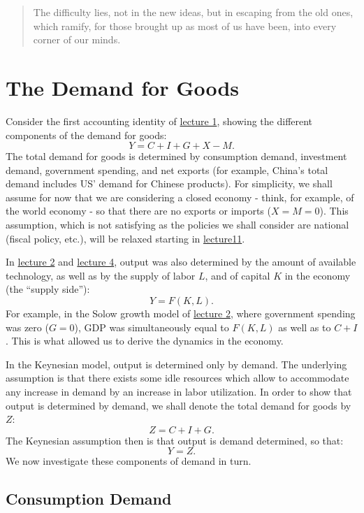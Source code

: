 \documentclass[]{book}
\theoremstyle{definition}
\theoremstyle{definition}
\theoremstyle{definition}
\theoremstyle{remark}
\begin{document}
\begin{quote}
The difficulty lies, not in the new ideas, but in escaping from the old
ones, which ramify, for those brought up as most of us have been, into
every corner of our minds.
\end{quote}

\section{The Demand for Goods}\label{the-demand-for-goods}

Consider the first accounting identity of
\protect\hyperlink{intro-cobb}{lecture 1}, showing the different
components of the demand for goods: \[Y=C+I+G+X-M.\] The total demand
for goods is determined by consumption demand, investment demand,
government spending, and net exports (for example, China's total demand
includes US' demand for Chinese products). For simplicity, we shall
assume for now that we are considering a closed economy - think, for
example, of the world economy - so that there are no exports or imports
(\(X=M=0\)). This assumption, which is not satisfying as the policies we
shall consider are national (fiscal policy, etc.), will be relaxed
starting in \href{lecture11.html}{lecture11}.

In \protect\hyperlink{solow}{lecture 2} and \href{Lecture4.html}{lecture
4}, output was also determined by the amount of available technology, as
well as by the supply of labor \(L\), and of capital \(K\) in the
economy (the ``supply side''): \[Y=F\left(K, L\right).\] For example, in
the Solow growth model of \protect\hyperlink{solow}{lecture 2}, where
government spending was zero (\(G=0\)), GDP was simultaneously equal to
\(F(K,L)\) as well as to \(C+I\). This is what allowed us to derive the
dynamics in the economy.

In the Keynesian model, output is determined only by demand. The
underlying assumption is that there exists some idle resources which
allow to accommodate any increase in demand by an increase in labor
utilization. In order to show that output is determined by demand, we
shall denote the total demand for goods by \(Z\): \[Z=C+I+G.\] The
Keynesian assumption then is that output is demand determined, so that:
\[Y=Z.\] We now investigate these components of demand in turn.

\subsection{Consumption Demand}\label{consumption-demand}
\end{document}
